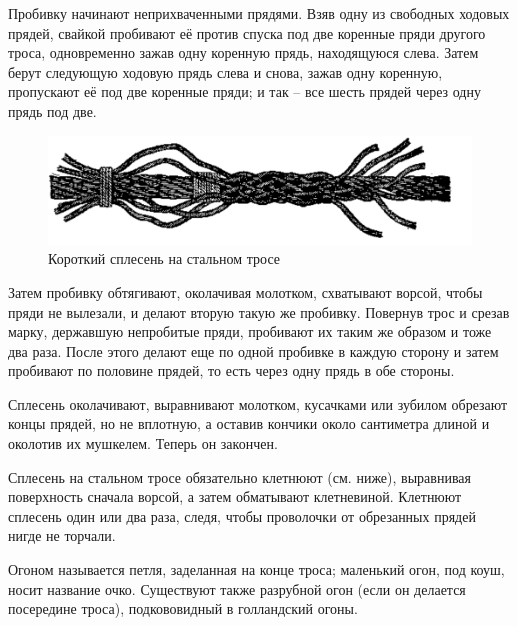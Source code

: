 \documentclass[a4paper, 12pt, twoside, final]{scrbook}
\begin{document}
Пробивку начинают неприхваченными прядями. Взяв одну из свободных ходовых прядей, свайкой пробивают её против спуска под две коренные пряди другого троса, одновременно зажав одну коренную прядь, находящуюся слева. Затем берут следующую ходовую прядь слева и снова, зажав одну коренную, пропускают её под две коренные пряди; и так \--- все шесть прядей через одну прядь под две.


\begin{figure}[htbp]
   \centering
   \includegraphics{pics/65_Splesen_na_stalnom_trose} %
   \caption{Короткий сплесень на стальном тросе}
   \label{fig:65}
\end{figure}

Затем пробивку обтягивают, околачивая молотком, схватывают ворсой, чтобы пряди не вылезали, и делают вторую такую же пробивку. Повернув трос и срезав марку, державшую непробитые пряди, пробивают их таким же образом и тоже два раза. После этого делают еще по одной пробивке в каждую сторону и затем пробивают по половине прядей, то есть через одну прядь в обе стороны.

Сплесень околачивают, выравнивают молотком, кусачками или зубилом обрезают концы прядей, но не вплотную, а оставив кончики около сантиметра длиной и околотив их мушкелем. Теперь он закончен.

Сплесень на стальном тросе обязательно клетнюют (см. ниже), выравнивая поверхность сначала ворсой, а затем обматывают клетневиной. Клетнюют сплесень один или два раза, следя, чтобы проволочки от обрезанных прядей нигде не торчали.

Огоном называется петля, заделанная на конце троса; маленький огон, под коуш, носит название очко. Существуют также разрубной огон (если он делается посередине троса), подкововидный в голландский огоны.
\end{document}
